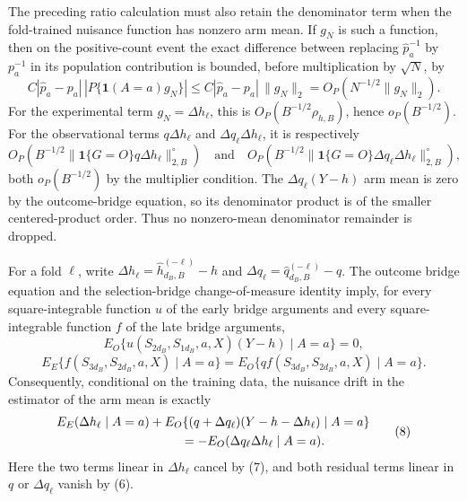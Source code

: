 The preceding ratio calculation must also retain the denominator term when the fold-trained nuisance function has nonzero arm mean.  If \(g_N\) is such a function, then on the positive-count event the exact difference between replacing \(\widehat p_a^{-1}\) by \(p_a^{-1}\) in its population contribution is bounded, before multiplication by \(\sqrt N\), by
\[
 C|\widehat p_a-p_a|\,|P\{\mathbf 1(A=a)g_N\}|
 \le C|\widehat p_a-p_a|\,\|g_N\|_2
 =O_P(N^{-1/2}\|g_N\|_2). \tag{5a}
\]
For the experimental term \(g_N=\Delta h_\ell\), this is \(O_P(B^{-1/2}\rho_{h,B})\), hence \(o_P(B^{-1/2})\).  For the observational terms \(q\Delta h_\ell\) and \(\Delta q_\ell\Delta h_\ell\), it is respectively
\[
 O_P\!\left(B^{-1/2}\|\mathbf1\{G=O\}q\Delta h_\ell\|_{2,B}^{\circ}\right)
 \quad\text{and}\quad
 O_P\!\left(B^{-1/2}\|\mathbf1\{G=O\}\Delta q_\ell\Delta h_\ell\|_{2,B}^{\circ}\right), \tag{5b}
\]
both \(o_P(B^{-1/2})\) by the multiplier condition.  The \(\Delta q_\ell(Y-h)\) arm mean is zero by the outcome-bridge equation, so its denominator product is of the smaller centered-product order. Thus no nonzero-mean denominator remainder is dropped.

For a fold \(\ell\), write \(\Delta h_\ell=\widehat h_{d_B,B}^{(-\ell)}-h\) and \(\Delta q_\ell=\widehat q_{d_B,B}^{(-\ell)}-q\).  The outcome bridge equation and the selection-bridge change-of-measure identity imply, for every square-integrable function \(u\) of the early bridge arguments and every square-integrable function \(f\) of the late bridge arguments,
\[
 E_O\{u(S_{2d_B},S_{1d_B},a,X)(Y-h)\mid A=a\}=0, \tag{6}
\]
\[
 E_E\{f(S_{3d_B},S_{2d_B},a,X)\mid A=a\}
 =E_O\{q f(S_{3d_B},S_{2d_B},a,X)\mid A=a\}. \tag{7}
\]
Consequently, conditional on the training data, the nuisance drift in the estimator of the arm mean is exactly
\[
\begin{aligned}
 &E_E(\Delta h_\ell\mid A=a)
 +E_O\{(q+\Delta q_\ell)(Y-h-\Delta h_\ell)\mid A=a\}\\
 &\hspace{35mm}=-E_O(\Delta q_\ell\Delta h_\ell\mid A=a).
\end{aligned} \tag{8}
\]
Here the two terms linear in \(\Delta h_\ell\) cancel by (7), and both residual terms linear in \(q\) or \(\Delta q_\ell\) vanish by (6).

